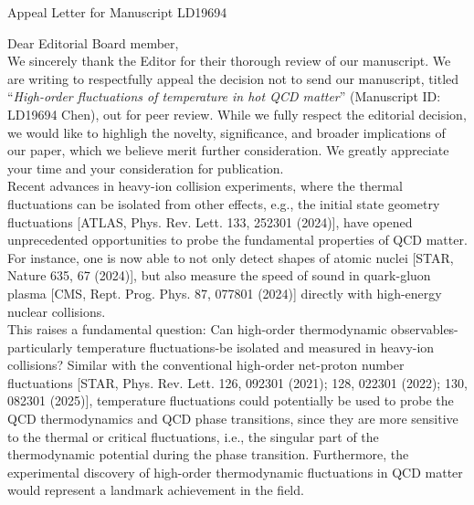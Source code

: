 \documentclass[a4paper,11pt, oneside,titlepage]{article}
\begin{document}

\pagestyle{empty} 




\begin{center}
{\LARGE Appeal Letter for Manuscript LD19694}\\[5ex]
\end{center}
 
\noindent Dear Editorial Board member,\\[-1ex]

\noindent We sincerely thank the Editor for their thorough review of our manuscript. We are writing to respectfully appeal the decision not to send our manuscript, titled ``\textit{High-order fluctuations of temperature in hot QCD matter}'' (Manuscript ID: LD19694 Chen), out for peer review. While we fully respect the editorial decision, we would like to highligh the novelty, significance, and broader implications of our paper, which we believe merit further consideration. We greatly appreciate your time and your consideration for publication.\\

\noindent Recent advances in heavy-ion collision experiments, where the thermal fluctuations can be isolated from other effects, e.g., the initial state geometry fluctuations [ATLAS, Phys. Rev. Lett. 133, 252301 (2024)], have opened unprecedented opportunities to probe the fundamental properties of QCD matter. For instance, one is now able to not only detect shapes of atomic nuclei [STAR, Nature 635, 67 (2024)], but also measure the speed of sound in quark-gluon plasma [CMS, Rept. Prog. Phys. 87, 077801 (2024)] directly with high-energy nuclear collisions.  \\

\noindent This raises a fundamental question: Can high-order thermodynamic observables-particularly temperature fluctuations-be isolated and measured in heavy-ion collisions? Similar with the conventional high-order net-proton number fluctuations [STAR, Phys. Rev. Lett. 126, 092301 (2021); 128, 022301 (2022); 130, 082301 (2025)], temperature fluctuations could potentially be used to probe the QCD thermodynamics and QCD phase transitions, since they are more sensitive to the thermal or critical fluctuations, i.e., the singular part of the thermodynamic potential during the phase transition. Furthermore, the experimental discovery of high-order thermodynamic fluctuations in QCD matter would represent a landmark achievement in the field.\\
\end{document}

